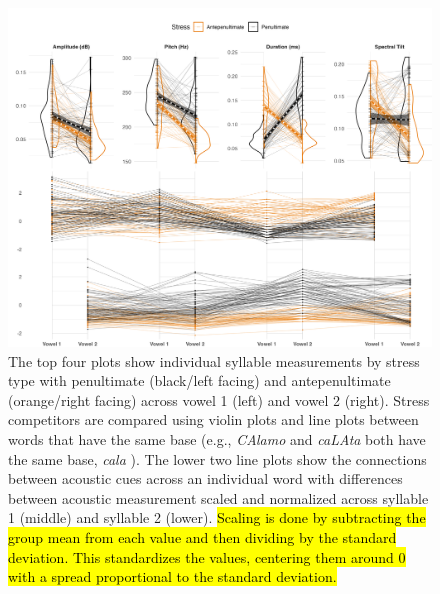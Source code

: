 \begin{figure}[H]
  \centering
  \includegraphics[width=1\linewidth]{visuals/raw_acoustics_combined.jpeg}
  \caption{The top four plots show individual syllable measurements by stress type with penultimate (black/left facing) and antepenultimate (orange/right facing)  across vowel 1 (left) and vowel 2 (right). Stress competitors are compared using violin plots and line plots between words that have the same base (e.g., \textit{CAlamo} and \textit{caLAta} both have the same base, \textit{cala} ). The lower two line plots show the connections between acoustic cues across an individual word with differences between acoustic measurement scaled and normalized across syllable 1 (middle) and syllable 2 (lower). \hl{Scaling is done by subtracting the group mean from each value and then dividing by the standard deviation. This standardizes the values, centering them around 0 with a spread proportional to the standard deviation.}}
  \label{fig:raw_acoustics}
\end{figure}


